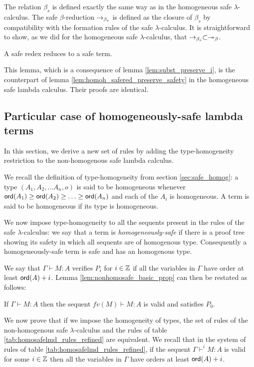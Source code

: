 The relation $\beta_s$ is defined exactly the same way as in the homogeneous safe $\lambda$-calculus. The safe $\beta$-reduction $\rightarrow_{\beta_s}$ is defined as the closure of $\beta_s$ by
compatibility with the formation rules of the safe
$\lambda$-calculus.  It is straightforward to show, as we did for the homogeneous safe $\lambda$-calculus, that $\rightarrow_{\beta_s} \subset \twoheadrightarrow_\beta$.


\begin{lem}
\label{lem:safereduction} A safe redex reduces to a safe term.
\end{lem}

This lemma, which is a consequence of lemma
\ref{lem:subst_preserve_i}, is the counterpart of lemma
\ref{lem:homoh_safered_preserve_safety} in the homogeneous safe
lambda calculus. Their proofs are identical.


\subsection{Particular case of homogeneously-safe lambda terms}

In this section, we derive a new set of rules by adding the type-homogeneity restriction to the non-homogenous safe lambda calculus.

We recall the definition of type-homogeneity from section
\ref{sec:safe_homog}: a type $(A_1, A_2, \ldots A_n, o)$ is said to
be homogeneous whenever ${\sf ord}(A_1) \geq {\sf ord}(A_2) \geq \ldots \geq
{\sf ord}(A_n)$ and each of the $A_i$ is homogeneous. A term is said to
be homogeneous if its type is homogeneous.

We now impose type-homogeneity to all the sequents present in the
rules of the safe $\lambda$-calculus: we say that a term is
\emph{homogeneously-safe} if there is a proof tree showing its
safety in which all sequents are of homogenous type. Consequently a
homogeneously-safe term is safe and has an homogenous type.

We say that $\Gamma \vdash M : A$ verifies $P_i$ for $i \in \mathbb{Z}$
if all the variables in $\Gamma$ have order at least ${\sf ord}(A)+i$.
Lemma \ref{lem:nonhomosafe_basic_prop} can then be restated as
follows:
\begin{lem}
\label{lem:context_reduction} If $\Gamma \vdash M : A$ then the sequent $fv(M) \vdash M : A$ is valid and satisfies $P_0$.
\end{lem}


We now prove that if we impose the homogeneity of types, the set of
rules of the non-homogenous safe $\lambda$-calculus and the rules of
table \ref{tab:homosafelmd_rules_refined} are equivalent.  We recall
that in the system of rules of table
\ref{tab:homosafelmd_rules_refined}, if the sequent $\Gamma
\vdash^{i} M : A$ is valid for some $i \in \mathbb{Z}$ then all the
variables in $\Gamma$ have orders at least ${\sf ord}(A)+i$.

